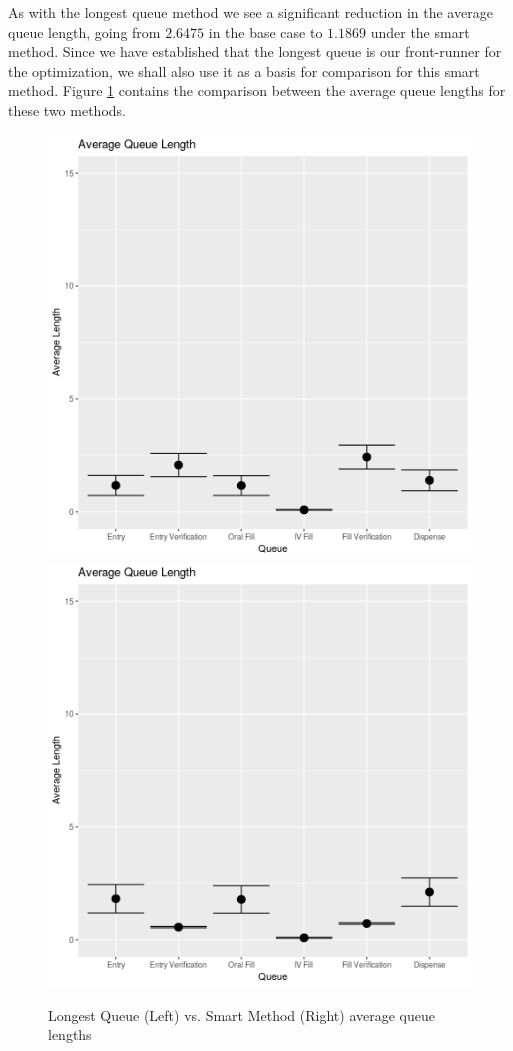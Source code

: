 \documentclass[10pt]{report}            %
\begin{document}
As with the longest queue method we see a significant reduction in the average queue length, going from $2.6475$ in the base case to $1.1869$ under the smart method. Since we have established that the longest queue is our front-runner for the optimization, we shall also use it as a basis for comparison for this smart method. Figure \ref{fig:longvsmart} contains the comparison between the average queue lengths for these two methods.
\begin{figure}[H]
\centering
\includegraphics[scale=.35]{LongestQueueCIs.png}
\includegraphics[scale=.35]{SmartQueueCIs.png}
\caption{Longest Queue (Left) vs. Smart Method (Right) average queue lengths}
\label{fig:longvsmart}
\end{figure}
\end{document}
